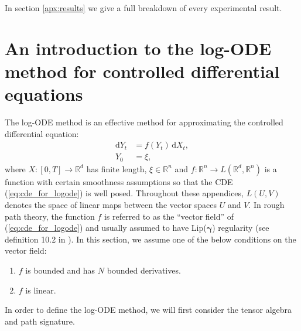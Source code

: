 \documentclass{article}
\newcommand{\R}{\mathbb{R}}
\newcommand{\dby}{\mathrm{d}}
\begin{document}
In section \ref{apx:results} we give a full breakdown of every experimental result.

\section{An introduction to the log-ODE method for controlled differential equations}\label{apx:logode}

The log-ODE method is an effective method for approximating the controlled differential equation:
\begin{align}
\dby Y_t & = f(Y_t)\,\dby X_t,
\label{eq:cde_for_logode}\\[3pt]
Y_0 & = \xi,\nonumber
\end{align}
where $X : [0,T]\rightarrow \R^d$ has finite length, $\xi\in\R^n$ and $f : \R^n \rightarrow L(\R^d, \R^n)$ is a function with certain smoothness assumptions so that the CDE (\ref{eq:cde_for_logode}) is well posed. Throughout these appendices, $L(U, V)$ denotes the space of linear maps between the vector spaces $U$ and $V$. In rough path theory, the function $f$ is referred to as the ``vector field'' of (\ref{eq:cde_for_logode}) and usually assumed to have \textup{Lip(}$\boldsymbol{\gamma}$\textup{)} regularity
(see definition 10.2 in \citet{friz2010multidimensional}). In this section, we assume one of the below conditions on the vector field:
\begin{enumerate}
\item $f$ is bounded and has $N$ bounded derivatives.
\item $f$ is linear.
\end{enumerate}

In order to define the log-ODE method, we will first consider the tensor algebra and path signature.\smallbreak
\end{document}
